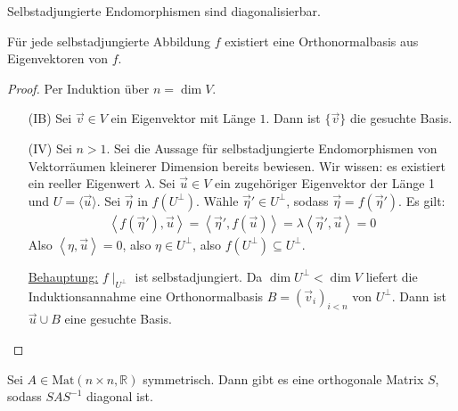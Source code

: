 \documentclass{report}
\newcommand*{\newpar}{\par\vspace{\baselineskip}\noindent}
\newcommand{\ul}[1]{\underline{#1}}
\newcommand{\bR}{\mathbb{R}}
\renewcommand{\vu}{\vec{u}}
\newcommand{\vv}{\vec{v}}
\newcommand{\veta}{\vec{\eta}}
\newcommand{\scalar}[2]{\left\langle #1, #2 \right\rangle}
\begin{document}
\begin{corollary}
 Selbstadjungierte Endomorphismen sind diagonalisierbar.
\end{corollary}
\begin{theorem}
 Für jede selbstadjungierte Abbildung $f$ existiert eine Orthonormalbasis aus Eigenvektoren von $f$.
\end{theorem}
\begin{proof}
 Per Induktion über $n = \dim V$.
 \begin{enumerate}
  \item[(IB)] Sei $\vv \in V$ ein Eigenvektor mit Länge $1$. Dann ist $\{\vv\}$ die gesuchte Basis.
  \item[(IV)] Sei $n > 1$. Sei die Aussage für selbstadjungierte Endomorphismen von Vektorräumen kleinerer Dimension bereits bewiesen. Wir wissen: es existiert ein reeller Eigenwert $\lambda$. Sei $\vu \in V$ ein zugehöriger Eigenvektor der Länge 1 und $U = \langle \vu \rangle$. Sei $\veta$ in $f(U^\bot)$. Wähle $\veta' \in U^\bot$, sodass $\veta = f(\veta')$.  Es gilt:
  \begin{align*}
   \scalar{f(\veta')}{\vu} = \scalar{\veta'}{f(\vu)} = \lambda\scalar{\veta'}{\vu} = 0
  \end{align*}
  Also $\scalar{\eta}{\vu} = 0$, also $\eta \in U^\bot$, also $f(U^\bot) \subseteq U^\bot$.
  \newpar
  \ul{Behauptung:} $f \mid_{U^\bot}$ ist selbstadjungiert. Da $\dim U^\bot < \dim V$ liefert die Induktionsannahme eine Orthonormalbasis $B = (\vv_i)_{i < n}$ von $U^\bot$. Dann ist $\vu \cup B$ eine gesuchte Basis.
 \end{enumerate}
\end{proof}
\begin{proposition}
 Sei $A \in \text{Mat}(n \times n, \bR)$ symmetrisch. Dann gibt es eine orthogonale Matrix $S$, sodass $SAS^{-1}$ diagonal ist.
\end{proposition}

%
%
%
%
%
%
%
%
%
%
%
%
%
%
%
%
%
%
%
%
%
%
%
%
%
%
%
%
%
%
%
%
%
%
%
%
%
%
%
%
%
%
%
%
%
%
%
\appendix
\end{document}
